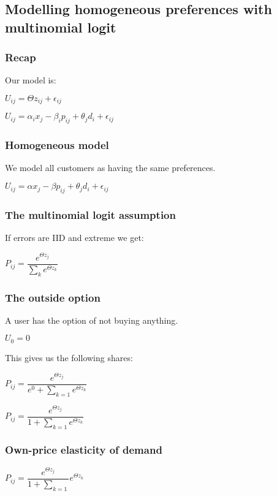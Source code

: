 
\subsection{Modelling homogeneous preferences with multinomial logit}

\subsubsection{Recap}

Our model is:

\(U_{ij}=\Theta z_{ij} + \epsilon_{ij}\)

\(U_{ij}=\alpha_i x_j -\beta_i p_{ij} + \theta_j d_i +\epsilon_{ij}\)

\subsubsection{Homogeneous model}

We model all customers as having the same preferences.

\(U_{ij}=\alpha x_j -\beta p_{ij} + \theta_j d_i +\epsilon_{ij}\)

\subsubsection{The multinomial logit assumption}

If errors are IID and extreme we get:

\(P_{ij}=\dfrac{e^{\Theta z_j}}{\sum_k e^{\Theta z_k }}\)

\subsubsection{The outside option}

A user has the option of not buying anything.

\(U_0=0\)

This gives us the following shares:

\(P_{ij}=\dfrac{e^{\Theta z_j}}{e^0+\sum_{k=1} e^{\Theta z_k }}\)

\(P_{ij}=\dfrac{e^{\Theta z_j}}{1+\sum_{k=1} e^{\Theta z_k }}\)

\subsubsection{Own-price elasticity of demand}

\(P_{ij}=\dfrac{e^{\Theta z_j}}{1+\sum_{k=1}} e^{\Theta z_k }\)

